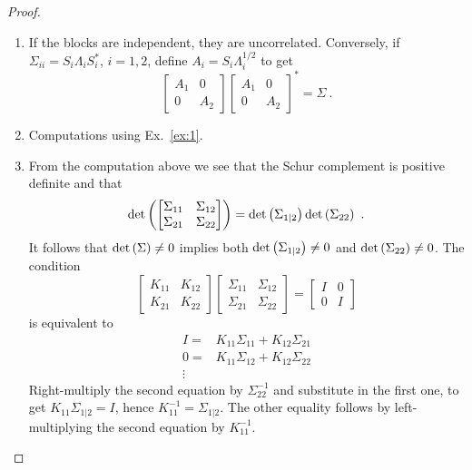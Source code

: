 \documentclass[12pt,a4paper]{amsart}
\theoremstyle{plain}%
\theoremstyle{definition}
\theoremstyle{remark}
\begin{document}
\begin{proof}
%
\begin{enumerate}
\item 
If the blocks are independent, they are uncorrelated. Conversely, if $\Sigma_{ii} = S_i\Lambda_iS_i^*$, $i = 1,2$, define $A_i = S_i\Lambda_i^{1/2}$ to get
\begin{equation*}
  \begin{bmatrix}
    A_1 & 0 \\ 0 & A_2
  \end{bmatrix}  \begin{bmatrix}
    A_1 & 0 \\ 0 & A_2
  \end{bmatrix}^* = \Sigma \ .
\end{equation*}
\item Computations using Ex.~\ref{ex:1}.
\item 
From the computation above we see that the Schur complement is positive definite and that 
%
\begin{equation*}
  \operatorname{det}\left(\begin{bmatrix}
      \Sigma_{11} & \Sigma_{12} \\ \Sigma_{21} & \Sigma_{22}
    \end{bmatrix}
  \right) = \operatorname{det}\left(\Sigma_{1|2}\right) \operatorname{det}\left(\Sigma_{22}\right) \ .
\end{equation*}
%
It follows that $\operatorname{det}\left(\Sigma\right) \ne 0$ implies both $\operatorname{det}\left(\Sigma_{1|2}\right) \ne 0$ and $\operatorname{det}\left(\Sigma_{22}\right) \ne 0$. The condition
\begin{equation*}
  \begin{bmatrix}
    K_{11} & K_{12} \\ K_{21} & K_{22}
  \end{bmatrix}
  \begin{bmatrix}
    \Sigma_{11} & \Sigma_{12} \\ \Sigma_{21} & \Sigma_{22}
  \end{bmatrix}
=
\begin{bmatrix}
  I & 0 \\ 0 & I
\end{bmatrix}
\end{equation*}
is equivalent to
\begin{align*}
 I =& K_{11}\Sigma_{11} + K_{12}\Sigma_{21} \\
 0 =& K_{11}\Sigma_{12} + K_{12}\Sigma_{22} \\
\vdots& 
\end{align*}
Right-multiply the second equation by $\Sigma_{22}^{-1}$ and substitute in the first one, to get $K_{11}\Sigma_{1|2} = I$, hence $K_{11}^{-1}=\Sigma_{1|2}$. The other equality follows by left-multiplying the second equation by $K^{-1}_{11}$.
\end{enumerate}
\end{proof}
\end{document}
